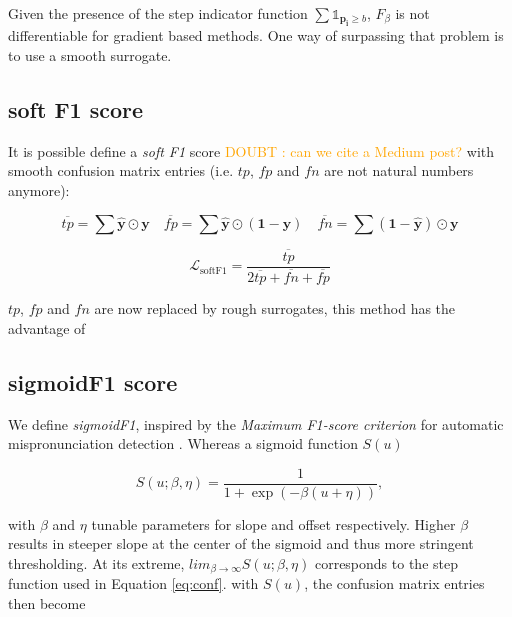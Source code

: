 \documentclass[sigconf,natbib,screen=true,review=true,anonymous]{acmart}
\newcommand\doubt[1]{\textcolor{orange}{DOUBT : #1}}
\begin{document}
Given the presence of the step indicator function \(\sum \mathds{1}_{\mathbf{p_i} \geq b}\), \(F_\beta\) is not differentiable for gradient based methods. One way of surpassing that problem is to use a smooth surrogate.

\subsection{soft F1 score}
\label{sec:org5c3257d}

It is possible define a \emph{soft F1} score \cite{softF1} \doubt{can we cite a Medium post?} with smooth confusion matrix entries (i.e. \(tp\), \(fp\) and \(fn\) are not natural numbers anymore):

$$
\overline{tp}=\sum \hat{\mathbf{y}} \odot \mathbf{y} \quad \overline{fp} = \sum \hat{\mathbf{y}} \odot (\mathbf{1}- \mathbf{y}) \quad \overline{fn} = \sum (\mathbf{1} - \hat{\mathbf{y}}) \odot \mathbf{y}
$$

\begin{equation}
\mathcal{L}_{\text {softF1}}= \frac{\overline{tp}}{2 \overline{tp}+ \overline{fn}+ \overline{fp}}
\end{equation}

\(tp\), \(fp\) and \(fn\) are now replaced by rough surrogates, this method has the advantage of 


\subsection{sigmoidF1 score}
\label{sec:org17efaac}

We define \emph{sigmoidF1}, inspired by the \emph{Maximum F1-score criterion} for automatic mispronunciation detection \cite{sigmoid}. Whereas a sigmoid function \(S(u)\)

\begin{equation}
S(u; \beta, \eta)=\frac{1}{1+\exp (-\beta (u + \eta))},
\end{equation}

with \(\beta\) and \(\eta\) tunable parameters for slope and offset respectively. Higher \(\beta\) results in steeper slope at the center of the sigmoid and thus more stringent thresholding. At its extreme, \(lim_{\beta\to\infty} S(u; \beta, \eta)\) corresponds to the step function used in Equation \ref{eq:conf}. with \(S(u)\), the confusion matrix entries then become
\end{document}
